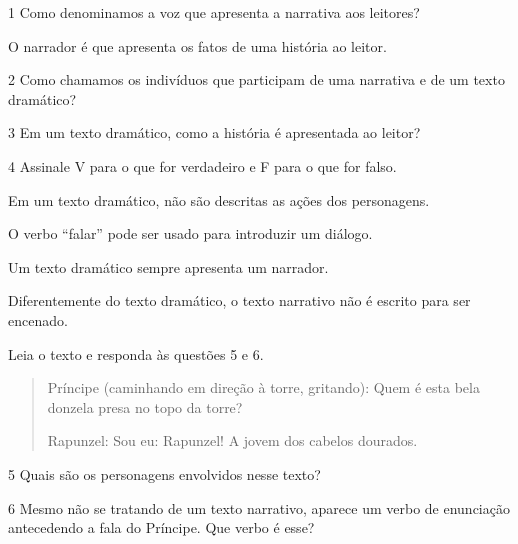 
\num{1} Como denominamos a voz que apresenta a narrativa aos leitores?

\coment O narrador é que apresenta os fatos de uma história ao leitor.


\num{2} Como chamamos os indivíduos que participam de uma narrativa e de um
texto dramático?



\num{3} Em um texto dramático, como a história é apresentada ao leitor?



\num{4} Assinale V para o que for verdadeiro e F para o que for falso.

\begin{boxlist}
\item Em um texto dramático, não são descritas as ações dos personagens. 

\item O verbo ``falar'' pode ser usado para introduzir um diálogo. 

\item Um texto dramático sempre apresenta um narrador. 

\item Diferentemente do texto dramático, o texto narrativo não é escrito para ser encenado. 
\end{boxlist}

Leia o texto e responda às questões 5 e 6.

\begin{quote}
Príncipe (caminhando em direção à torre, gritando): Quem é esta bela
donzela presa no topo da torre?

Rapunzel: Sou eu: Rapunzel! A jovem dos cabelos dourados.
\end{quote}

\num{5} Quais são os personagens envolvidos nesse texto?


\num{6} Mesmo não se tratando de um texto narrativo, aparece um verbo de enunciação antecedendo a fala do Príncipe. Que verbo é esse?

